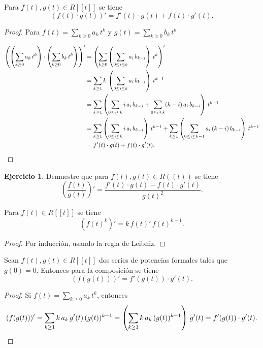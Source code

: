 \documentclass{article}
\numberwithin{equation}{section}
\theoremstyle{definition}
\newtheorem{ejercicio}{Ejercicio}
\begin{document}
\begin{observacion}
  Para $f (t), g (t) \in R [\![t]\!]$ se tiene
  $$(f (t)\cdot g (t))' = f' (t)\cdot g (t) + f (t)\cdot g' (t).$$

  \begin{proof}
    Para $f (t) = \sum_{k \ge 0} a_k\,t^k$ y $g (t) = \sum_{k \ge 0} b_k\,t^k$

    \begin{align*}
      \left( \left(\sum_{k\ge 0} a_k\,t^k\right)\cdot
      \left(\sum_{k\ge 0} b_k\,t^k\right) \right)' & = \left(\sum_{k\ge 0} \left(\sum_{0 \le i \le k} a_i\,b_{k-i}\right)\,t^k\right)' \\
                                                   & = \sum_{k\ge 1} k\,\left(\sum_{0 \le i \le k} a_i\,b_{k-i}\right)\,t^{k-1} \\
                                                   & = \sum_{k\ge 1} \left(\sum_{0 \le i \le k} i \, a_i\,b_{k-i} + \sum_{0 \le i \le k} (k-i) \, a_i\,b_{k-i}\right)\,t^{k-1} \\
                                                   & = \sum_{k \ge 1} \left(\sum_{0 \le i \le k} i \, a_i\,b_{k-i}\right)\,t^{k-1} + \sum_{k \ge 1} \left(\sum_{0 \le i \le k-1} a_i\,(k-i)\,b_{k-i}\right)\,t^{k-1} \\
                                                   & = f' (t)\cdot g (t) + f (t)\cdot g' (t).
                                                     \qedhere
    \end{align*}
  \end{proof}
\end{observacion}

\begin{ejercicio}
  Demuestre que para $f(t), g(t) \in R (\!(t)\!)$ se tiene
  $$\left(\frac{f(t)}{g(t)}\right)' = \frac{f' (t) \cdot g(t) - f (t)\cdot g' (t)}{g (t)^2}.$$
\end{ejercicio}

\begin{corolario}
  Para $f (t) \in R [\![t]\!]$ se tiene
  $$(f (t)^k)' = k\,f(t)'\,f(t)^{k-1}.$$

  \begin{proof}
    Por inducción, usando la regla de Leibniz.
  \end{proof}
\end{corolario}

\begin{observacion}
  \label{regla-de-la-cadena-formal}
  Sean $f (t), g (t) \in R [\![t]\!]$ dos series de potencias formales tales que
  $g (0) = 0$. Entonces para la composición se tiene
  $$(f (g (t)))' = f' (g (t)) \cdot g' (t).$$

  \begin{proof}
    Si $f (t) = \sum_{k\ge 0} a_k\,t^k$, entonces
    \[ (f (g (t)))' =
      \sum_{k\ge 1} k\,a_k\,g' (t)\, (g (t))^{k-1} =
      \left( \sum_{k \ge 1} k\,a_k\,(g (t))^{k-1} \right) \, g' (t) =
      f' (g (t))\cdot g' (t). \qedhere \]
  \end{proof}
\end{observacion}
\end{document}
